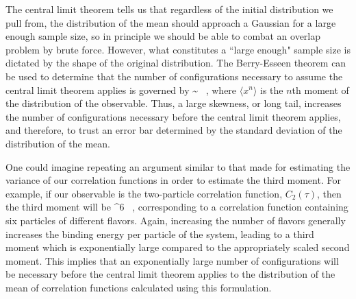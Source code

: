 The central limit theorem tells us that regardless of the initial distribution we pull from, the distribution of the mean should approach a Gaussian for a large enough sample size, so in principle we should be able to combat an overlap problem by brute force. However, what constitutes a ``large enough" sample size is dictated by the shape of the original distribution. The Berry-Esseen theorem \cite{BerryEsseen1,BerryEsseen2} can be used to determine that the number of configurations necessary to assume the central limit theorem applies is governed by
\beq
\sqrt{\Ncfg} \sim {} \ ,
\eeq
where $\langle x^n \rangle$ is the $n$th moment of the distribution of the observable. Thus, a large skewness, or long tail, increases the number of configurations necessary before the central limit theorem applies, and therefore, to trust an error bar determined by the standard deviation of the distribution of the mean.

One could imagine repeating an argument similar to that made for estimating the variance of our correlation functions in order to estimate the third moment. For example, if our observable is the two-particle correlation function, $C_2(\tau)$, then the third moment will be
\beq
\langle {}^6 \rangle \ ,
\eeq
corresponding to a correlation function containing six particles of different flavors. Again, increasing the number of flavors generally increases the binding energy per particle of the system, leading to a third moment which is exponentially large compared to the appropriately scaled second moment. This implies that an exponentially large number of configurations will be necessary before the central limit theorem applies to the distribution of the mean of correlation functions calculated using this formulation. 


